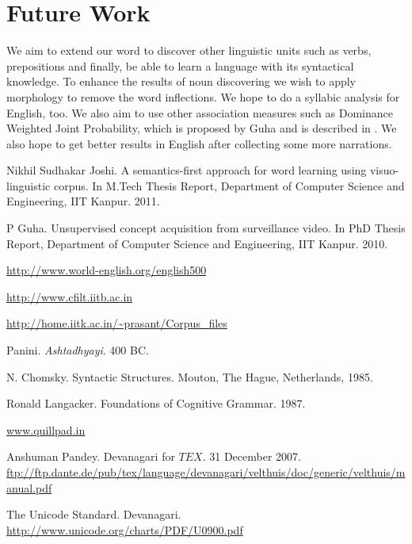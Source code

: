 \documentclass[12pt, a4paper]{report}
\begin{document}
\section{Future Work}
We aim to extend our word to discover other linguistic units such as verbs, prepositions and finally, be able to learn a language with its syntactical knowledge. To enhance the results of noun discovering we wish to apply morphology to remove the word inflections. We hope to do a syllabic analysis for English, too. We also aim to use other association measures such as Dominance Weighted Joint Probability, which is proposed by Guha and is described in \cite{guha}. We also hope to get better results in English after collecting some more narrations.

\begin{thebibliography}{1}

Nikhil Sudhakar Joshi. A semantics-first approach for word learning using visuo-linguistic corpus. In M.Tech Thesis Report, Department of Computer Science and Engineering, IIT Kanpur. 2011.

P Guha. Unsupervised concept acquisition from surveillance video. In PhD Thesis Report, Department of Computer Science and Engineering, IIT Kanpur. 2010.

\url{http://www.world-english.org/english500}

\url{http://www.cfilt.iitb.ac.in}

\url{http://home.iitk.ac.in/~prasant/Corpus_files}

Panini. \textit{Ashtadhyayi}. 400 BC.

N. Chomsky. Syntactic Structures. Mouton, The Hague, Netherlands, 1985.

Ronald Langacker. Foundations of Cognitive Grammar. 1987.

\url{www.quillpad.in}

Anshuman Pandey. Devanagari for $TEX$. 31 December 2007. \url{ftp://ftp.dante.de/pub/tex/language/devanagari/velthuis/doc/generic/velthuis/manual.pdf}

The Unicode Standard. Devanagari. \url{http://www.unicode.org/charts/PDF/U0900.pdf}


\end{thebibliography}
\end{document}
